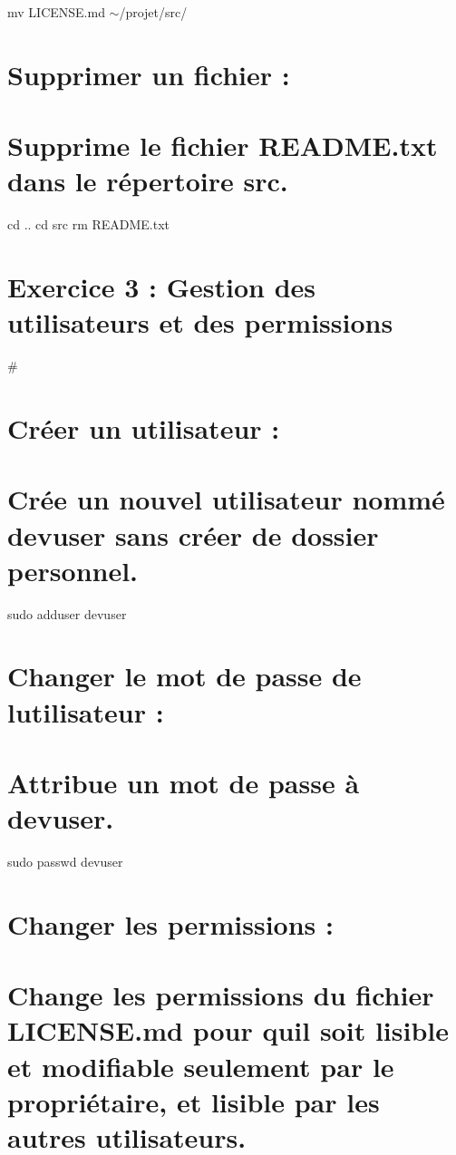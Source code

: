 mv L\+I\+C\+E\+N\+S\+E.\+md $\sim$/projet/src/

\section*{Supprimer un fichier \+:}

\section*{Supprime le fichier R\+E\+A\+D\+M\+E.\+txt dans le répertoire src.}

cd .. cd src rm R\+E\+A\+D\+M\+E.\+txt

\section*{Exercice 3 \+: Gestion des utilisateurs et des permissions}

\# \section*{Créer un utilisateur \+:}

\section*{Crée un nouvel utilisateur nommé devuser sans créer de dossier personnel.}

sudo adduser devuser \section*{Changer le mot de passe de l\textquotesingle{}utilisateur \+:}

\section*{Attribue un mot de passe à devuser.}

sudo passwd devuser

\section*{Changer les permissions \+:}

\section*{Change les permissions du fichier L\+I\+C\+E\+N\+S\+E.\+md pour qu\textquotesingle{}il soit lisible et modifiable seulement par le propriétaire, et lisible par les autres utilisateurs.}

